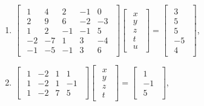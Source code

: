 \documentclass{article}
\begin{document}
\begin{enumerate}
\begin{enumerate}
            \item $\begin{bmatrix}\begin{array}{rrrrr} 1 & 4 & 2 & -1 & 0\\ 2 & 9 & 6 & -2 & -3\\ 1 & 2 & -1 & -1 & 5\\ -2 & -7 & 1 & 3 & -4\\ -1 & -5 & -1 & 3 & 6 \end{array}\end{bmatrix} \begin{bmatrix}\begin{array}{r} x\\ y\\ z\\ t\\ u \end{array}\end{bmatrix} = \begin{bmatrix}\begin{array}{r} 3\\ 5\\ 5\\ -5\\ 4 \end{array}\end{bmatrix}$,

            \item $\begin{bmatrix}\begin{array}{rrrr} 1 & -2 & 1 & 1\\ 1 & -2 & 1 & -1\\ 1 & -2 & 7 & 5 \end{array}\end{bmatrix} \begin{bmatrix}\begin{array}{r} x\\ y\\ z\\ t \end{array}\end{bmatrix} = \begin{bmatrix}\begin{array}{r} 1\\ -1\\ 5 \end{array}\end{bmatrix}$,


\end{enumerate}
\end{enumerate}
\end{document}
